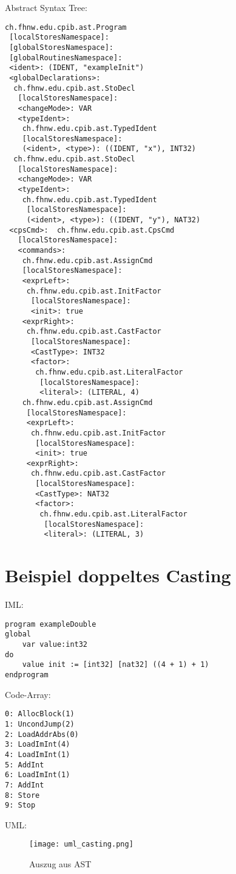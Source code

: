 \documentclass[10pt, a4paper, twocolumn]{article} %
\begin{document}
\newpage
\vspace*{0.3cm}
Abstract Syntax Tree:
\begin{lstlisting}
ch.fhnw.edu.cpib.ast.Program
 [localStoresNamespace]:
 [globalStoresNamespace]:
 [globalRoutinesNamespace]:
 <ident>: (IDENT, "exampleInit")
 <globalDeclarations>:
  ch.fhnw.edu.cpib.ast.StoDecl
   [localStoresNamespace]:
   <changeMode>: VAR
   <typeIdent>:
    ch.fhnw.edu.cpib.ast.TypedIdent
    [localStoresNamespace]:
    (<ident>, <type>): ((IDENT, "x"), INT32)
  ch.fhnw.edu.cpib.ast.StoDecl
   [localStoresNamespace]:
   <changeMode>: VAR
   <typeIdent>:
    ch.fhnw.edu.cpib.ast.TypedIdent
     [localStoresNamespace]:
     (<ident>, <type>): ((IDENT, "y"), NAT32)
 <cpsCmd>:  ch.fhnw.edu.cpib.ast.CpsCmd
   [localStoresNamespace]:
   <commands>:
    ch.fhnw.edu.cpib.ast.AssignCmd
    [localStoresNamespace]:
    <exprLeft>:
     ch.fhnw.edu.cpib.ast.InitFactor
      [localStoresNamespace]:
      <init>: true
    <exprRight>:
     ch.fhnw.edu.cpib.ast.CastFactor
      [localStoresNamespace]:
      <CastType>: INT32
      <factor>:
       ch.fhnw.edu.cpib.ast.LiteralFactor
        [localStoresNamespace]:
        <literal>: (LITERAL, 4)
    ch.fhnw.edu.cpib.ast.AssignCmd
     [localStoresNamespace]:
     <exprLeft>:
      ch.fhnw.edu.cpib.ast.InitFactor
       [localStoresNamespace]:
       <init>: true
     <exprRight>:
      ch.fhnw.edu.cpib.ast.CastFactor
       [localStoresNamespace]:
       <CastType>: NAT32
       <factor>:
        ch.fhnw.edu.cpib.ast.LiteralFactor
         [localStoresNamespace]:
         <literal>: (LITERAL, 3)
\end{lstlisting}

\clearpage
\section{Beispiel doppeltes Casting}
\label{bsp_casting}
IML:
\begin{lstlisting}
program exampleDouble
global
    var value:int32
do
    value init := [int32] [nat32] ((4 + 1) + 1)
endprogram
\end{lstlisting}

Code-Array:
\begin{lstlisting}
0: AllocBlock(1)
1: UncondJump(2)
2: LoadAddrAbs(0)
3: LoadImInt(4)
4: LoadImInt(1)
5: AddInt
6: LoadImInt(1)
7: AddInt
8: Store
9: Stop
\end{lstlisting}

UML:
\begin{figure}[H]
    \texttt{[image: uml\_casting.png]} %
    \caption{Auszug aus AST } %
    \label{casting}
\end{figure}
\end{document}
